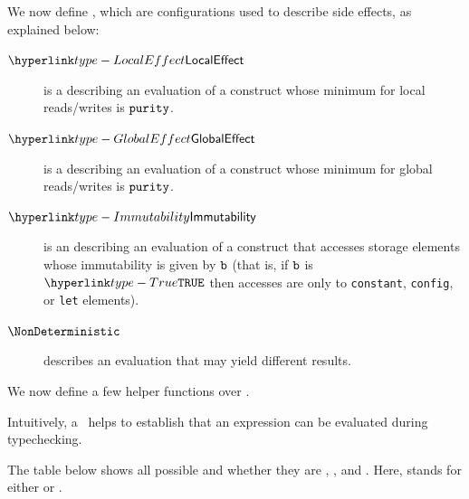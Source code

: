
\hypertarget{def-sideeffectdescriptorterm}{}
We now define \sideeffectdescriptorsterm,
which are configurations used to describe side effects, as explained below:


\hypertarget{def-term-LocalEffect}{}
\begin{description}
    \item[$\LocalEffect$] is a \LocalEffectTerm{} describing an evaluation of a construct whose minimum \purity{} for local reads/writes is $\texttt{purity}$.
    \hypertarget{def-term-GlobalEffect}{}
    \item[$\GlobalEffect$] is a \GlobalEffectTerm{} describing an evaluation of a construct whose minimum \purity{} for global reads/writes is $\texttt{purity}$.
    \hypertarget{def-term-Immutability}{}
    \item[$\Immutability$] is an \ImmutabilityTerm{} describing an evaluation of a construct that accesses storage elements whose immutability is given by $\texttt{b}$ (that is, if $\texttt{b}$ is $\True$ then accesses are only to \texttt{constant}, \texttt{config}, or \texttt{let} elements).
    \item[$\NonDeterministic$] describes an evaluation that may yield different results.
\end{description}

We now define a few helper functions over \sideeffectdescriptorsterm.

Intuitively, a \emph{\pureterm} \sideeffectdescriptorterm\ helps to establish that
an expression can be evaluated during typechecking.

The table below shows all possible \sideeffectdescriptorsterm{} and whether they are \pureterm{}, \readonlyterm{}, and \symbolicallyevaluableterm{}.
%
Here, \Effect{} stands for either \LocalEffect{} or \GlobalEffect{}.

